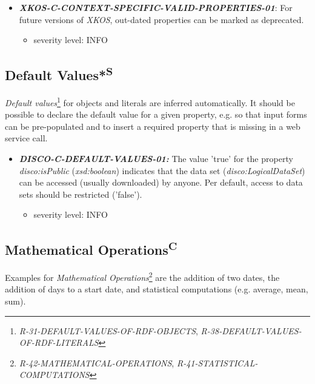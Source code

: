 \documentclass{llncs}
\begin{document}
\begin{itemize}
	\item \textbf{{\em XKOS-C-CONTEXT-SPECIFIC-VALID-PROPERTIES-01}}: For future versions of \emph{XKOS}, out-dated properties can be marked as deprecated.
	\begin{itemize}
		\item severity level: INFO
	\end{itemize}
\end{itemize}

\subsection{Default Values*\textsuperscript{S}}

\emph{Default values}\footnote{{\em R-31-DEFAULT-VALUES-OF-RDF-OBJECTS}, {\em R-38-DEFAULT-VALUES-OF-RDF-LITERALS}} for objects and literals are inferred automatically.
It should be possible to declare the default value for a given property, e.g. so that input forms can be pre-populated and to insert a required property that is missing in a web service call.

\begin{itemize}
	\item \textbf{{\em DISCO-C-DEFAULT-VALUES-01:}}
The value 'true' for the property {\em disco:isPublic} ({\em xsd:boolean}) indicates that the data set ({\em disco:LogicalDataSet}) can be accessed (usually downloaded) by anyone.
Per default, access to data sets should be restricted ('false').
\begin{itemize}
		\item severity level: INFO
	\end{itemize}
\end{itemize}

\subsection{Mathematical Operations\textsuperscript{C}}

Examples for {\em Mathematical Operations}\footnote{{\em R-42-MATHEMATICAL-OPERATIONS}, {\em R-41-STATISTICAL-COMPUTATIONS}} are the addition of two dates, the addition of days to a start date, and statistical computations (e.g. average, mean, sum).
\end{document}
